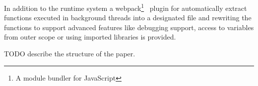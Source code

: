 In addition to the runtime system a webpack\footnote{A module bundler for JavaScript}~\cite{webpack} plugin for automatically extract functions executed in background threads into a designated file and rewriting the functions to support advanced features like debugging support, access to variables from outer scope or using imported libraries is provided.

TODO describe the structure of the paper.

